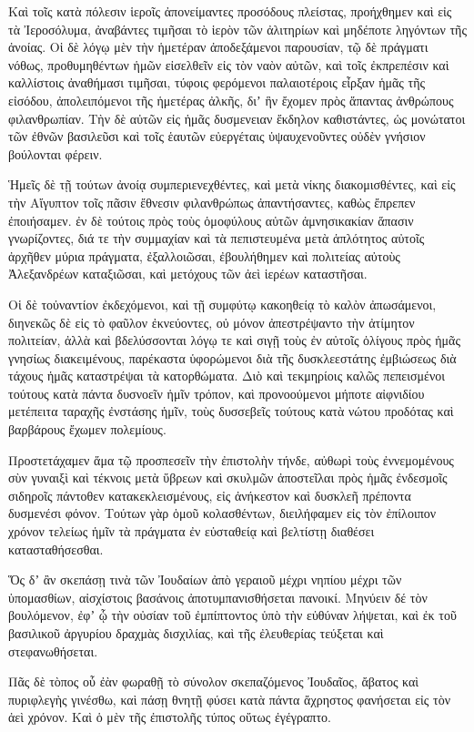 {\par }{\PP {}Καὶ τοῖς κατὰ πόλεσιν ἱεροῖς ἀπονείμαντες προσόδους πλείστας, προήχθημεν καὶ εἰς τὰ Ἰεροσόλυμα, ἀναβάντες τιμῆσαι τὸ ἱερὸν τῶν ἀλιτηρίων καὶ μηδέποτε ληγόντων τῆς ἀνοίας.
Οἱ δὲ λόγῳ μὲν τὴν ἡμετέραν ἀποδεξάμενοι παρουσίαν, τῷ δὲ πράγματι νόθως, προθυμηθέντων ἡμῶν εἰσελθεῖν εἰς τὸν ναὸν αὐτῶν, καὶ τοῖς ἐκπρεπέσιν καὶ καλλίστοις ἀναθήμασι τιμῆσαι,
τύφοις φερόμενοι παλαιοτέροις εἶρξαν ἡμᾶς τῆς εἰσόδου, ἀπολειπόμενοι τῆς ἡμετέρας ἀλκῆς, διʼ ἣν ἔχομεν πρὸς ἅπαντας ἀνθρώπους φιλανθρωπίαν.
Τὴν δὲ αὐτῶν εἰς ἡμᾶς δυσμενειαν ἔκδηλον καθιστάντες, ὡς μονώτατοι τῶν ἐθνῶν βασιλεῦσι καὶ τοῖς ἑαυτῶν εὐεργέταις ὑψαυχενοῦντες οὐδὲν γνήσιον βούλονται φέρειν.
\par }{\PP {}Ἡμεῖς δὲ τῇ τούτων ἀνοίᾳ συμπεριενεχθέντες, καὶ μετὰ νίκης διακομισθέντες, καὶ εἰς τὴν Αἴγυπτον τοῖς πᾶσιν ἔθνεσιν φιλανθρώπως ἀπαντήσαντες, καθὼς ἔπρεπεν ἐποιήσαμεν.
ἐν δὲ τούτοις πρὸς τοὺς ὁμοφύλους αὐτῶν ἀμνησικακίαν ἅπασιν γνωρίζοντες, διά τε τὴν συμμαχίαν καὶ τὰ πεπιστευμένα μετὰ ἁπλότητος αὐτοῖς ἀρχῆθεν μύρια πράγματα, ἐξαλλοιῶσαι, ἐβουλήθημεν καὶ πολιτείας αὐτοὺς Ἀλεξανδρέων καταξιῶσαι, καὶ μετόχους τῶν ἀεὶ ἱερέων καταστῆσαι.
\par }{\PP {}Οἱ δὲ τοὐναντίον ἐκδεχόμενοι, καὶ τῇ συμφύτῳ κακοηθείᾳ τὸ καλὸν ἀπωσάμενοι, διηνεκῶς δὲ εἰς τὸ φαῦλον ἐκνεύοντες,
οὐ μόνον ἀπεστρέψαντο τὴν ἀτίμητον πολιτείαν, ἀλλὰ καὶ βδελύσσονται λόγῳ τε καὶ σιγῇ τοὺς ἐν αὐτοῖς ὀλίγους πρὸς ἡμᾶς γνησίως διακειμένους, παρέκαστα ὑφορώμενοι διὰ τῆς δυσκλεεστάτης ἐμβιώσεως διὰ τάχους ἡμᾶς καταστρέψαι τὰ κατορθώματα.
Διὸ καὶ τεκμηρίοις καλῶς πεπεισμένοι τούτους κατὰ πάντα δυσνοεῖν ἡμῖν τρόπον, καὶ προνοούμενοι μήποτε αἰφνιδίου μετέπειτα ταραχῆς ἐνστάσης ἡμῖν, τοὺς δυσσεβεῖς τούτους κατὰ νώτου προδότας καὶ βαρβάρους ἔχωμεν πολεμίους.
\par }{\PP {}Προστετάχαμεν ἅμα τῷ προσπεσεῖν τὴν ἐπιστολὴν τήνδε, αὐθωρὶ τοὺς ἐννεμομένους σὺν γυναιξὶ καὶ τέκνοις μετὰ ὕβρεων καὶ σκυλμῶν ἀποστεῖλαι πρὸς ἡμᾶς ἐνδεσμοῖς σιδηροῖς πάντοθεν κατακεκλεισμένους, εἰς ἀνήκεστον καὶ δυσκλεῆ πρέποντα δυσμενέσι φόνον.
Τούτων γὰρ ὁμοῦ κολασθέντων, διειλήφαμεν εἰς τὸν ἐπίλοιπον χρόνον τελείως ἡμῖν τὰ πράγματα ἐν εὐσταθείᾳ καὶ βελτίστῃ διαθέσει κατασταθήσεσθαι.
\par }{\PP {}Ὅς δʼ ἂν σκεπάσῃ τινὰ τῶν Ἰουδαίων ἀπὸ γεραιοῦ μέχρι νηπίου μέχρι τῶν ὑπομασθίων, αἰσχίστοις βασάνοις ἀποτυμπανισθήσεται πανοικί.
Μηνύειν δέ τὸν βουλόμενον, ἐφʼ ᾧ τὴν οὐσίαν τοῦ ἐμπίπτοντος ὑπὸ τὴν εὐθύναν λήψεται, καὶ ἐκ τοῦ βασιλικοῦ ἀργυρίου δραχμὰς δισχιλίας, καὶ τῆς ἐλευθερίας τεύξεται καὶ στεφανωθήσεται.
\par }{\PP {}Πᾶς δὲ τὸπος οὗ ἐὰν φωραθῇ τὸ σύνολον σκεπαζόμενος Ἰουδαῖος, ἄβατος καὶ πυριφλεγὴς γινέσθω, καὶ πάσῃ θνητῇ φύσει κατὰ πάντα ἄχρηστος φανήσεται εἰς τὸν ἀεὶ χρόνον.
Καὶ ὁ μὲν τῆς ἐπιστολῆς τύπος οὕτως ἐγέγραπτο.

}
